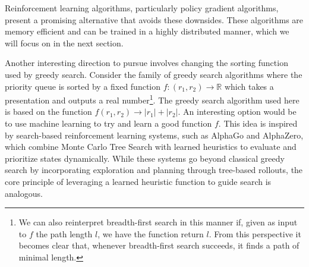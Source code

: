 Reinforcement learning algorithms, particularly policy gradient algorithms, present a promising alternative that avoids these downsides.
These algorithms are memory efficient and can be trained in a highly distributed manner, which we will focus on in the next section.

Another interesting direction to pursue involves changing the sorting function used by greedy search. Consider the family of greedy search algorithms where the priority queue is sorted by a fixed function $f: (r_1, r_2) \to \mathbb{R}$ which takes a presentation and outputs a real number\footnote{We can also reinterpret breadth-first search in this manner if, given as input to $f$ the path length $l$, we have the function return $l$. From this perspective it becomes clear that, whenever breadth-first search succeeds, it finds a path of minimal length.}. The greedy search algorithm used here is based on the function $f(r_1, r_2) \to |r_1| + |r_2|$. An interesting option would be to use machine learning to try and learn a good function $f$. This idea is inspired by search-based reinforcement learning systems, such as AlphaGo and AlphaZero, which combine Monte Carlo Tree Search with learned heuristics to evaluate and prioritize states dynamically. While these systems go beyond classical greedy search by incorporating exploration and planning through tree-based rollouts, the core principle of leveraging a learned heuristic function to guide search is analogous.